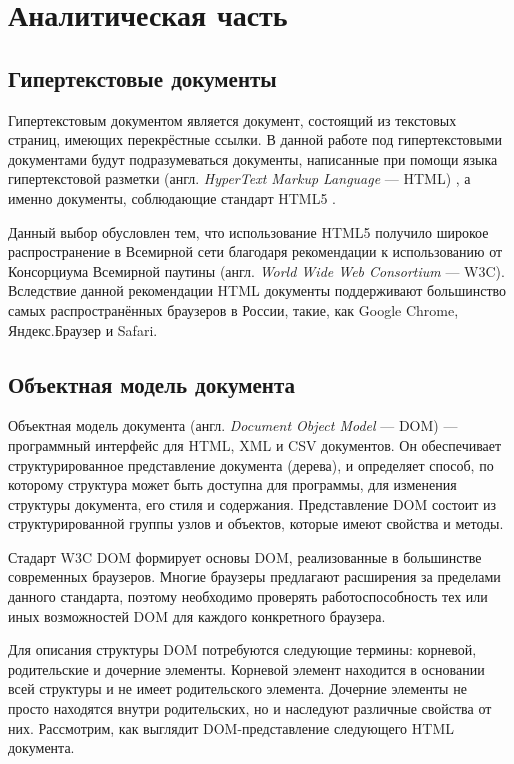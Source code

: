 \section{Аналитическая часть}

\subsection{Гипертекстовые документы}

Гипертекстовым документом является документ, состоящий из текстовых страниц, имеющих перекрёстные ссылки. 
В данной работе под гипертекстовыми документами будут подразумеваться документы, написанные при помощи языка гипертекстовой разметки (англ. \textit{HyperText Markup Language} --- HTML) \cite{html}, а именно документы, соблюдающие стандарт HTML5 \cite{html-doc}.


Данный выбор обусловлен тем, что использование HTML5 получило широкое распространение в Всемирной сети благодаря рекомендации \cite{html-recommendation} к использованию от Консорциума Всемирной паутины (англ. \textit{World Wide Web Consortium} --- W3C).
Вследствие данной рекомендации HTML документы поддерживают большинство самых распространённых браузеров в России, такие, как Google Chrome, Яндекс.Браузер и Safari. 

\subsection{Объектная модель документа}
Объектная модель документа (англ. \textit{Document Object Model} --- DOM) \cite{dom} --- программный интерфейс для HTML, XML и CSV документов. 
Он обеспечивает структурированное представление документа (дерева), и определяет способ, по которому структура может быть доступна для программы, для изменения структуры документа, его стиля и содержания.
Представление DOM состоит из структурированной группы узлов и объектов, которые имеют свойства и методы.

Стадарт W3C DOM \cite{dom-doc} формирует основы DOM, реализованные в большинстве современных браузеров. 
Многие браузеры предлагают расширения за пределами данного стандарта, поэтому необходимо проверять работоспособность тех или иных возможностей DOM для каждого конкретного браузера.

Для описания структуры DOM потребуются следующие термины: корневой, родительские и дочерние элементы. 
Корневой элемент находится в основании всей структуры и не имеет родительского элемента.
Дочерние элементы не просто находятся внутри родительских, но и наследуют различные свойства от них.
Рассмотрим, как выглядит DOM-представление следующего HTML документа. 

